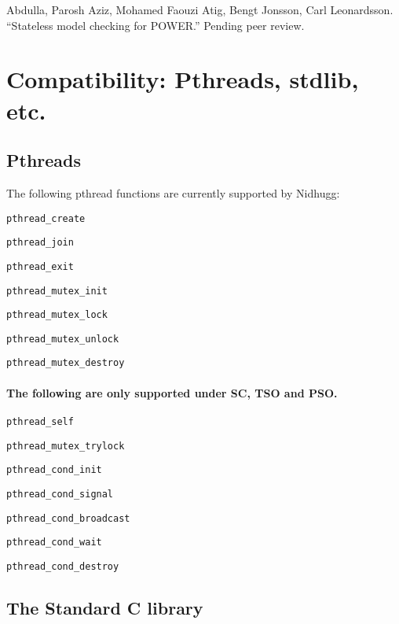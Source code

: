 \documentclass[a4paper]{article}
\begin{document}
\begin{thebibliography}{99}
  Abdulla, Parosh Aziz, Mohamed Faouzi Atig, Bengt Jonsson, Carl Leonardsson. ``Stateless model checking for POWER.'' Pending peer review.
\end{thebibliography}

\section{Compatibility: Pthreads, stdlib, etc.}

\subsection{Pthreads}

The following pthread functions are currently supported by Nidhugg:

\begin{description}
\item{\texttt{pthread\_create}}
\item{\texttt{pthread\_join}}
\item{\texttt{pthread\_exit}}
\item{\texttt{pthread\_mutex\_init}}
\item{\texttt{pthread\_mutex\_lock}}
\item{\texttt{pthread\_mutex\_unlock}}
\item{\texttt{pthread\_mutex\_destroy}}
\end{description}

\paragraph{The following are only supported under SC, TSO and PSO.}

\begin{description}
\item{\texttt{pthread\_self}}
\item{\texttt{pthread\_mutex\_trylock}}
\item{\texttt{pthread\_cond\_init}}
\item{\texttt{pthread\_cond\_signal}}
\item{\texttt{pthread\_cond\_broadcast}}
\item{\texttt{pthread\_cond\_wait}}
\item{\texttt{pthread\_cond\_destroy}}
\end{description}

\subsection{The Standard C library}\label{sec:stdlibc}
\end{document}
